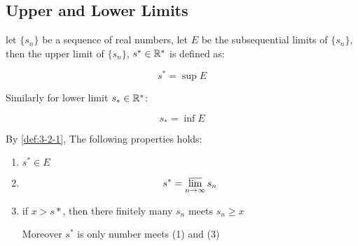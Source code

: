 \subsection{Upper and Lower Limits}

\begin{definition}
    \label{def:3-2-1}
    let $\{ s_n \}$ be a sequence of real numbers, let $E$ be the subsequential limits of $\{s_n\}$, then the
    upper limit of $\{ s_n \}$, $s^* \in \mathbb{R}^*$ is defined as:

    \[
        s^* = \sup E
    \]

    Similarly for lower limit $s_* \in \mathbb{R}^*$:

    \[
        s_* = \inf E
    \]
\end{definition}

\begin{thm}
    By \autoref{def:3-2-1}, The following properties holds:

    \begin{enumerate}
        \item $s^* \in E$

        \item 

        \[
            s^* = \varlimsup_{n \to \infty} s_n
        \]

        \item if $x > s*$, then there finitely many $s_n$ meets $s_n \ge x$

        Moreover $s^*$ is only number meets (1) and (3)
    \end{enumerate}
\end{thm}

